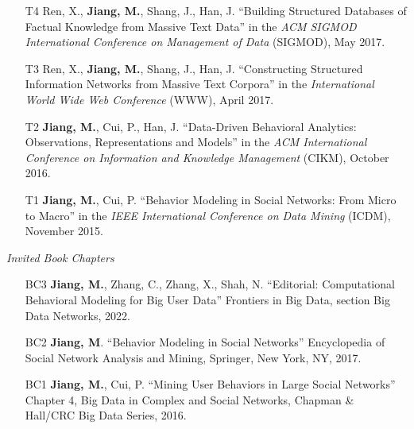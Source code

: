 \documentclass[10pt]{article}
\newenvironment{myindentpar}[1]%
{\begin{list}{}%
         {\setlength{\leftmargin}{#1}}%
         \item[]%
}
{\end{list}}
\newcounter{list}
\newcommand{\hide}[1]{}
\begin{document}
\begin{myindentpar}{0.00cm}
\begin{enumerate}[leftmargin=.5cm]
\item[T4] Ren, X., \textbf{Jiang, M.}, Shang, J., Han, J. ``Building Structured Databases of Factual Knowledge from Massive Text Data'' in the \textit{ACM SIGMOD International Conference on Management of Data} (SIGMOD), May 2017.
		
\item[T3] Ren, X., \textbf{Jiang, M.}, Shang, J., Han, J. ``Constructing Structured Information Networks from Massive Text Corpora'' in the \textit{International World Wide Web Conference}  (WWW), April 2017.

\item[T2] \textbf{Jiang, M.}, Cui, P., Han, J. ``Data-Driven Behavioral Analytics: Observations, Representations and Models'' in the \textit{ACM International Conference on Information and Knowledge Management} (CIKM), October 2016.
		
\item[T1] \textbf{Jiang, M.}, Cui, P. ``Behavior Modeling in Social Networks: From Micro to Macro'' in the \textit{IEEE International Conference on Data Mining} (ICDM), November 2015.

\end{enumerate}

\hspace{-0.25cm}\textit{Invited Book Chapters}

\begin{enumerate}[leftmargin=.5cm]

\item[BC3] \textbf{Jiang, M.}, Zhang, C., Zhang, X., Shah, N. ``Editorial: Computational Behavioral Modeling for Big User Data'' Frontiers in Big Data, section Big Data Networks, 2022.
		
\item[BC2] \textbf{Jiang, M}. ``Behavior Modeling in Social Networks'' Encyclopedia of Social Network Analysis and Mining, Springer, New York, NY, 2017.
		
\item[BC1] \textbf{Jiang, M.}, Cui, P. ``Mining User Behaviors in Large Social Networks'' Chapter 4, Big Data in Complex and Social Networks, Chapman \& Hall/CRC Big Data Series, 2016.

\end{enumerate}

\hide{
\hspace{-0.25cm}\textit{Preprints}

\begin{enumerate}[leftmargin=.5cm]


\end{enumerate}}
\end{myindentpar}
\end{document}
